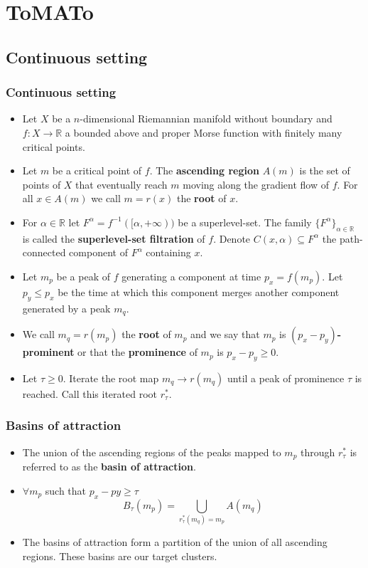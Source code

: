\documentclass{beamer}
\theoremstyle{definition}
\newcommand{\R}{\mathbb{R}}
\begin{document}
\section{ToMATo}
\subsection{Continuous setting}
\begin{frame}[fragile]
\frametitle{Continuous setting}
\begin{itemize}
\item<1-> Let $X$ be a $n$-dimensional Riemannian manifold without boundary and $f:X\to\R$ a bounded above and proper Morse function with finitely many critical points.
\item<2-> Let $m$ be a critical point of $f$. The \textbf{ascending region} $A(m)$ is the set of points of $X$ that eventually reach $m$ moving along the gradient flow of $f$. For all $x\in A(m)$ we call $m=r(x)$ the \textbf{root} of $x$.

\item<3-> For $\alpha\in\R$ let $F^\alpha=f^{-1}([\alpha,+\infty))$ be a superlevel-set. The family $\{F^\alpha\}_{\alpha\in\R}$ is called the \textbf{superlevel-set filtration} of $f$. Denote $C(x,\alpha)\subseteq F^\alpha$ the path-connected component of $F^\alpha$ containing $x$. %
\end{itemize}
\end{frame}

\begin{frame}
\begin{itemize}
\item<1-> Let $m_p$ be a peak of $f$ generating a component at time $p_x=f(m_p)$. Let $p_y\leq p_x$ be the time at which this component merges another component generated by a peak $m_q$. %
\item<2->We call $m_q=r(m_p)$ the \textbf{root} of $m_p$ and we say that $m_p$ is \textbf{$(p_x-p_y)$-prominent} or that the \textbf{prominence} of $m_p$ is $p_x-p_y\geq 0$.
\item<3-> Let $\tau\geq 0$. Iterate the root map $m_q\to r(m_q)$ until a peak of prominence $\tau$ is reached. Call this iterated root $r^*_\tau$.
\end{itemize}
\end{frame}
\begin{frame}
\frametitle{Basins of attraction}
\begin{itemize}
\item<1-> The union of the ascending regions of the peaks mapped to $m_p$ through $r^*_\tau$ is referred to as the \textbf{basin of attraction}.
\item<2-> $\forall m_p$ such that $p_x - py \geq\tau$
\[B_\tau(m_p)=\bigcup_{r^*_\tau(m_q)=m_p} A(m_q)\]
\item<3->[]The basins of attraction form a partition of the union of all ascending
regions. These basins are our target clusters.
\end{itemize}

\end{frame}
\end{document}
